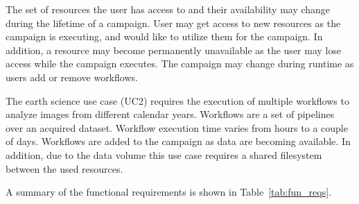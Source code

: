 The set of resources the user has access to and their availability may change during the lifetime of a campaign.
User may get access to new resources as the campaign is executing, and would like to utilize them for the campaign.
In addition, a resource may become permanently unavailable as the user may lose access while the campaign executes.
The campaign may change during runtime as users add or remove workflows.

The earth science use case (UC2) requires the execution of multiple workflows to analyze images from different calendar years.
Workflows are a set of pipelines over an acquired dataset.
Workflow execution time varies from hours to a couple of days.
Workflows are added to the campaign as data are becoming available.
In addition, due to the data volume this use case requires a shared filesystem between the used resources.

A summary of the functional requirements is shown in Table~\ref{tab:fun_reqs}.

